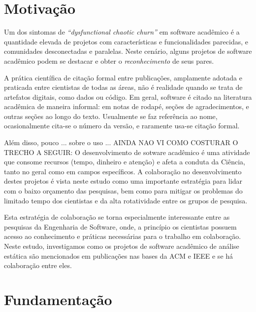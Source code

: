 \section{Motivação} \label{estudo2:introducao} %

Um dos sintomas de 
{\it ``dysfunctional chaotic churn''} \cite{howison2015understanding}
em software acadêmico é a quantidade elevada de projetos 
com características e funcionalidades parecidas, 
e comunidades desconectadas e paralelas.
Neste cenário, alguns projetos de software acadêmico
podem se destacar e obter o \textit{reconhecimento} de seus pares.

A prática científica de citação formal entre publicações, amplamente
adotada e praticada entre cientistas de todas as áreas, não é realidade quando
se trata de artefatos digitais, como dados ou código.
Em geral, software é citado na literatura acadêmica %
de maneira informal: em notas de rodapé, seções de agradecimentos, e outras
seções ao longo do texto. Usualmente se faz referência ao nome, ocasionalmente
cita-se o número da versão, e raramente usa-se citação formal.

Além disso, pouco  ... sobre o uso ...
AINDA NAO VI COMO COSTURAR O TRECHO A SEGUIR:
O desenvolvimento de sotware acadêmico é uma atividade que consome recursos
(tempo, dinheiro e atenção) e afeta a conduta da Ciência, tanto no geral como
em campos específicos.
A colaboração no desenvolvimento destes projetos é vista
neste estudo como uma importante estratégia para lidar com o baixo orçamento
das pesquisas, bem como para mitigar os problemas do limitado tempo dos
cientistas e da alta rotatividade entre os grupos de pesquisa.

Esta estratégia de colaboração se torna especialmente interessante entre as
pesquisas da Engenharia de Software, onde, a princípio os cientistas possuem
acesso ao conhecimento e práticas necessárias para o trabalho em colaboração.
Neste estudo, investigamos como os projetos de software acadêmico
de análise estática são mencionados em publicações nas bases da ACM e IEEE e se
há colaboração entre eles.


\section{Fundamentação} \label{estudo2:fundamentacao}

